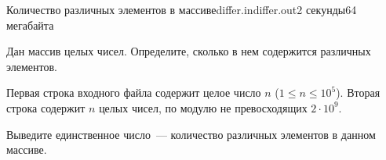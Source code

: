 \begin{problem}{Количество различных элементов в массиве}{differ.in}{differ.out}{2 секунды}{64 мегабайта}

Дан массив целых чисел. Определите, сколько в нем содержится различных элементов.


\InputFile
Первая строка входного файла содержит целое число 
$n$  (${1\leqslant n\leqslant 10^5}$). Вторая строка содержит $n$ целых чисел,
по модулю не превосходящих $2\cdot10^9$.


\OutputFile
Выведите единственное число~--- количество различных элементов в данном массиве.

\Examples

\begin{example}
%
%
%
\end{example}

\end{problem}
